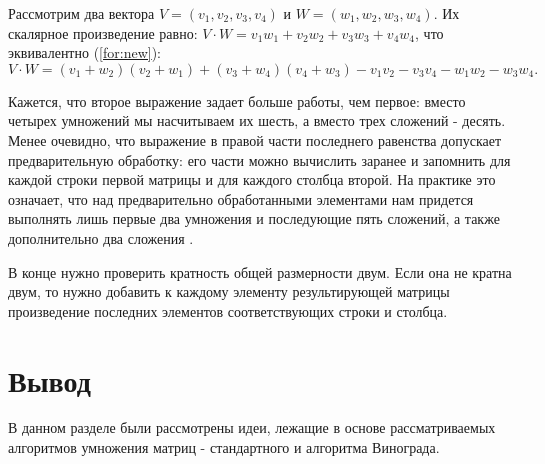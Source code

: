 Рассмотрим два вектора $V = (v_1, v_2, v_3, v_4)$ и $W = (w_1, w_2, w_3, w_4)$.
Их скалярное произведение равно: $V \cdot W = v_1w_1 + v_2w_2 + v_3w_3 + v_4w_4$, что эквивалентно (\ref{for:new}):
\begin{equation}
	\label{for:new}
	V \cdot W = (v_1 + w_2)(v_2 + w_1) + (v_3 + w_4)(v_4 + w_3) - v_1v_2 - v_3v_4 - w_1w_2 - w_3w_4.
\end{equation}

Кажется, что второе выражение задает больше работы, чем первое: вместо четырех умножений мы насчитываем их шесть, а вместо трех сложений - десять. Менее очевидно, что выражение в правой части последнего равенства допускает предварительную обработку: его части можно вычислить заранее и запомнить для каждой строки первой матрицы и для каждого столбца второй. На практике это означает, что над предварительно обработанными элементами нам придется выполнять лишь первые два умножения и последующие пять сложений, а также дополнительно два сложения \cite{vino}.

В конце нужно проверить кратность общей размерности двум. Если она не кратна двум, то нужно добавить к каждому элементу результирующей матрицы произведение последних элементов соответствующих  строки и столбца.

\section*{Вывод}

В данном разделе были рассмотрены идеи, лежащие в основе рассматриваемых алгоритмов умножения матриц - стандартного и алгоритма Винограда.